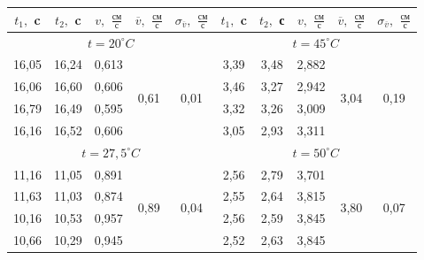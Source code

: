 \documentclass[12pt,a4paper]{article}
\begin{document}
\begin{table}[h]
\centering
\begin{tabular}{|c|c|c|c|c||c|c|c|c|c|}
\hline
$t_{1},$ c     & $t_{2},$ c   & $v,$ $\frac{\text{см}}{\text{с}}$   &$ \overline{v},$ $\frac{\text{см}}{\text{с}}$                & $\sigma_{\overline{v}}, $ $\frac{\text{см}}{\text{с}}$                &   $t_{1},$ c   & $t_{2},$ с    & $v,$ $\frac{\text{см}}{\text{с}}$    &$ \overline{v},$  $\frac{\text{см}}{\text{с}}$               & $\sigma_{\overline{v}}, $  $\frac{\text{см}}{\text{с}}$       \\ \hline
\multicolumn{5}{|c|}{ $t = 20^\circ C$}                                              & \multicolumn{5}{c|}{$t = 45^\circ C$}                                             \\ \hline
16,05 & 16,24 & 0,613 & \multirow{4}{*}{0,61} & \multirow{4}{*}{0,01} & 3,39 & 3,48 & 2,882 & \multirow{4}{*}{3,04} & \multirow{4}{*}{0,19} \\ \cline{1-3} \cline{6-8}
16,06 & 16,60 & 0,606 &                       &                       & 3,46 & 3,27 & 2,942 &                       &                       \\ \cline{1-3} \cline{6-8}
16,79 & 16,49 & 0,595 &                       &                       & 3,32 & 3,26 & 3,009 &                       &                       \\ \cline{1-3} \cline{6-8}
16,16 & 16,52 & 0,606 &                       &                       & 3,05 & 2,93 & 3,311 &                       &                       \\ \hline
\multicolumn{5}{|c|}{$t = 27,5^\circ C $}                                            & \multicolumn{5}{c|}{$t = 50^\circ C $}                                             \\ \hline
11,16 & 11,05 & 0,891 & \multirow{4}{*}{0,89} & \multirow{4}{*}{0,04} & 2,56 & 2,79 & 3,701 & \multirow{4}{*}{3,80} & \multirow{4}{*}{0,07} \\ \cline{1-3} \cline{6-8}
11,63 & 11,03 & 0,874 &                       &                       & 2,55 & 2,64 & 3,815 &                       &                       \\ \cline{1-3} \cline{6-8}
10,16 & 10,53 & 0,957 &                       &                       & 2,56 & 2,59 & 3,845 &                       &                       \\ \cline{1-3} \cline{6-8}
10,66 & 10,29 & 0,945 &                       &                       & 2,52 & 2,63 & 3,845 &                       &                       \\ \hline

\end{tabular}
\end{table}
\end{document}
